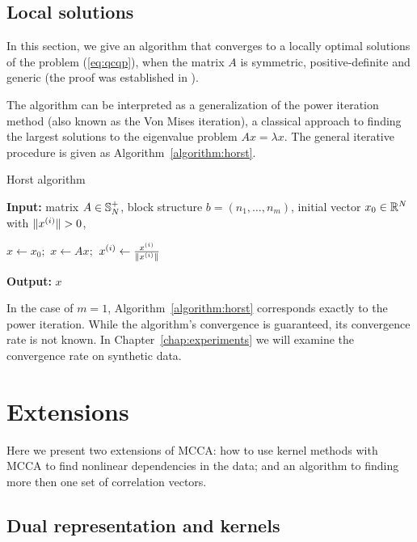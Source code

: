 \subsection{Local solutions}\label{chap:extensions:horst}
In this section, we give an algorithm that converges to a locally optimal 
solutions of the problem (\ref{eq:qcqp}), when the matrix $A$ is symmetric,
positive-definite and generic (the proof was established in \cite{Chu}).

The algorithm can be interpreted as a generalization of the power
iteration method (also known as the Von Mises iteration), a classical
approach to finding the largest solutions to the eigenvalue problem 
$A x = \lambda x$.  The general iterative procedure is given 
as Algorithm~\ref{algorithm:horst}.
\begin{algorithm}
\caption{Horst algorithm}
\label{algorithm:horst}
{\bf Input:} matrix $A \in \mathbb{S}_N^+$, block structure $b = \left(n_1,\ldots,n_m\right)$, 
initial vector $x_0 \in \mathbb{R}^N$ with $\lVert x^{(i)}\rVert > 0$,  \par
\begin{algorithmic}
\STATE $x \leftarrow x_0;$
\STATE $x \leftarrow A x;$
\STATE $x^{(i)} \leftarrow \frac{x^{(i)}}{\lVert x^{(i)}\rVert}$
\ENDFOR
\ENDFOR
\end{algorithmic}
{\bf Output:} $x$
\end{algorithm}

In the case of $m=1$,  Algorithm~\ref{algorithm:horst}
corresponds exactly to the power iteration. While the algorithm's
convergence is guaranteed, its convergence rate is not known. In
Chapter~\ref{chap:experiments} we will examine the convergence
rate on synthetic data.

\section{Extensions}

Here we present two extensions of MCCA: how to use kernel methods with
MCCA to find nonlinear dependencies in the data; and an
algorithm to finding more then one set of correlation vectors.
\subsection{Dual representation and kernels}\label{chap:extensions:kernels}

